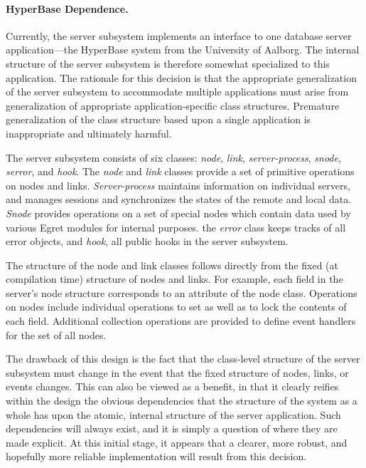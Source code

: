 \paragraph{HyperBase Dependence.}
Currently, the server subsystem implements an interface to one database
server application---the HyperBase system from the University of Aalborg.
The internal structure of the server subsystem is therefore somewhat
specialized to this application.  The rationale for this decision is
that the appropriate generalization of the server subsystem to accommodate
multiple applications must arise from generalization of appropriate 
application-specific class structures.  Premature generalization of the 
class structure based upon a single application is inappropriate and 
ultimately harmful. 

The server subsystem consists of six classes: {\it node\/}, {\it link\/},
{\it server-process\/}, {\it snode\/}, {\it serror\/}, and {\it hook\/}.
The {\it node\/} and {\it link\/} classes provide a set of primitive
operations on nodes and links. {\it Server-process \/} maintains
information on individual servers, and manages sessions and synchronizes
the states of the remote and local data. {\it Snode\/} provides operations
on a set of special nodes which contain data used by various Egret modules
for internal purposes. the {\it error \/} class keeps tracks of all error
objects, and {\it hook\/}, all public hooks in the server subsystem.

The structure of the node and link classes follows directly from the fixed
(at compilation time) structure of nodes and links. For example, each field
in the server's node structure corresponds to an attribute of the node
class.  Operations on nodes include individual operations to set as well as
to lock the contents of each field.  Additional collection operations are
provided to define event handlers for the set of all nodes.

The drawback of this design is the fact that the class-level structure
of the server subsystem must change in the event that the fixed
structure of nodes, links, or events changes.  This can also be viewed
as a benefit, in that it clearly reifies within the design the obvious
dependencies that the structure of the system as a whole has upon the
atomic, internal structure of the server application.  Such dependencies
will always exist, and it is simply a question of where they are made
explicit.  At this initial stage, it appears that a clearer, more
robust, and hopefully more reliable implementation will result from this
decision.  


